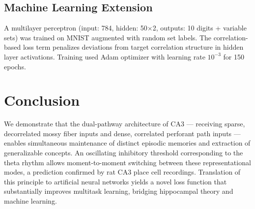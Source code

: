 \documentclass[11pt]{article}
\begin{document}
\subsection{Machine Learning Extension}

A multilayer perceptron (input: 784, hidden: 50$\times$2, outputs: 10 digits + variable sets) was trained on MNIST \citep{lecun1998gradient} augmented with random set labels. The correlation-based loss term penalizes deviations from target correlation structure in hidden layer activations. Training used Adam optimizer with learning rate $10^{-3}$ for 150 epochs.

\section{Conclusion}

We demonstrate that the dual-pathway architecture of CA3 --- receiving sparse, decorrelated mossy fiber inputs and dense, correlated perforant path inputs --- enables simultaneous maintenance of distinct episodic memories and extraction of generalizable concepts. An oscillating inhibitory threshold corresponding to the theta rhythm allows moment-to-moment switching between these representational modes, a prediction confirmed by rat CA3 place cell recordings. Translation of this principle to artificial neural networks yields a novel loss function that substantially improves multitask learning, bridging hippocampal theory and machine learning.



\end{document}
